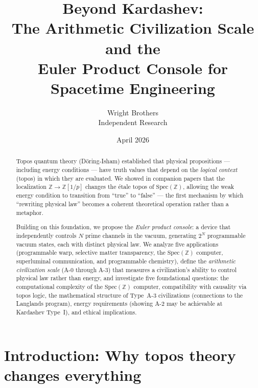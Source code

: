 \documentclass[11pt,a4paper]{article}
\newcommand{\Spec}{\mathrm{Spec}}
\newcommand{\Zp}{\mathbb{Z}[1/p]}
\begin{document}
\title{Beyond Kardashev:\\
  The Arithmetic Civilization Scale and the\\
  Euler Product Console for Spacetime Engineering}

\author{Wright Brothers\\{\small Independent Research}}
\date{April 2026}
\maketitle

\begin{abstract}
Topos quantum theory (D\"oring-Isham) established that physical
propositions --- including energy conditions --- have truth values
that depend on the \emph{logical context} (topos) in which they are
evaluated. We showed in companion papers that the localization
$\mathbb{Z} \to \Zp$ changes the \'etale topos of $\Spec(\mathbb{Z})$,
allowing the weak energy condition to transition from ``true'' to
``false'' --- the first mechanism by which ``rewriting physical law''
becomes a coherent theoretical operation rather than a metaphor.

Building on this foundation, we propose the \emph{Euler product
console}: a device that independently controls $N$ prime channels
in the vacuum, generating $2^N$ programmable vacuum states, each
with distinct physical law. We analyze five applications
(programmable warp, selective matter transparency, the $\Spec(\mathbb{Z})$
computer, superluminal communication, and programmable chemistry),
define the \emph{arithmetic civilization scale} (A-0 through A-3)
that measures a civilization's ability to control physical law rather
than energy, and investigate five foundational questions:
the computational complexity of the $\Spec(\mathbb{Z})$ computer,
compatibility with causality via topos logic, the mathematical
structure of Type~A-3 civilizations (connections to the Langlands
program), energy requirements (showing A-2 may be achievable at
Kardashev Type~I), and ethical implications.
\end{abstract}

\section{Introduction: Why topos theory changes everything}
\label{sec:intro}
\end{document}
